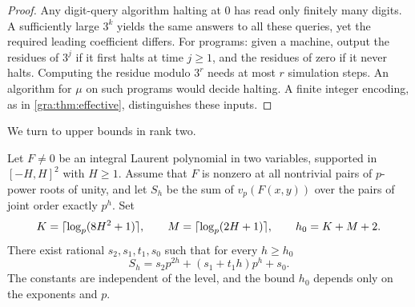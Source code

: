 \begin{proof}
Any digit-query algorithm halting at $0$ has read only finitely many
digits. A sufficiently large $3^k$ yields the same answers to all these
queries, yet the required leading coefficient differs. For programs: given
a machine, output the residues of $3^j$ if it first halts at time
$j\ge1$, and the residues of zero if it never halts. Computing the residue
modulo $3^r$ needs at most $r$ simulation steps. An algorithm for $\mu$ on
such programs would decide halting. A finite integer encoding, as in
\cref{gra:thm:effective}, distinguishes these inputs.
\end{proof}


We turn to upper bounds in rank two.

\begin{theorem}\label{gra:thm:shell}
Let $F\ne0$ be an integral Laurent polynomial in two variables, supported
in $[-H,H]^2$ with $H\ge1$. Assume that $F$ is nonzero at all nontrivial
pairs of $p$-power roots of unity, and let $S_h$ be the sum of
$v_p(F(x,y))$ over the pairs of joint order exactly $p^h$. Set
\[
 K=\lceil\log_p(8H^2+1)\rceil,\qquad M=\lceil\log_p(2H+1)\rceil,\qquad h_0=K+M+2 .
\]
There exist rational $s_2,s_1,t_1,s_0$ such that for every $h\ge h_0$
\[
 S_h=s_2p^{2h}+(s_1+t_1h)p^h+s_0 .
\]
The constants are independent of the level, and the bound $h_0$ depends
only on the exponents and $p$.
\end{theorem}

